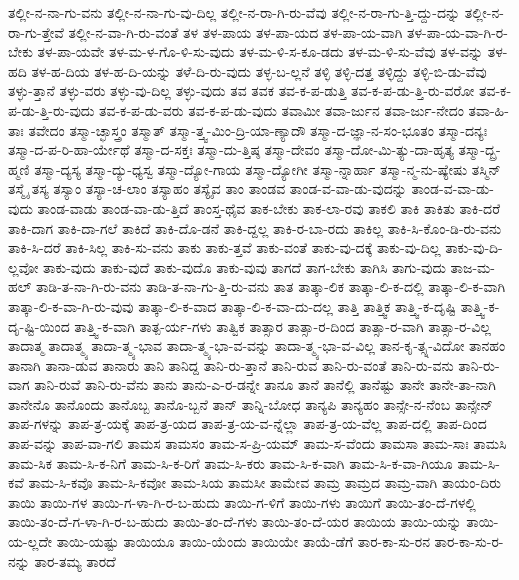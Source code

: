 {ತಲ್ಲೀ-ನ-ನಾ-ಗು-ವನು
ತಲ್ಲೀ-ನ-ನಾ-ಗು-ವು-ದಿಲ್ಲ
ತಲ್ಲೀ-ನ-ರಾ-ಗಿ-ರು-ವೆವು
ತಲ್ಲೀ-ನ-ರಾ-ಗು-ತ್ತಿ-ದ್ದು-ದನ್ನು
ತಲ್ಲೀ-ನ-ರಾ-ಗು-ತ್ತೇವೆ
ತಲ್ಲೀ-ನ-ವಾ-ಗಿ-ರು-ವಂತೆ
ತಳ
ತಳ-ಪಾಯ
ತಳ-ಪಾ-ಯದ
ತಳ-ಪಾ-ಯ-ವಾಗಿ
ತಳ-ಪಾ-ಯ-ವಾ-ಗಿ-ರ-ಬೇಕು
ತಳ-ಪಾ-ಯವೇ
ತಳ-ಮ-ಳ-ಗೊ-ಳಿ-ಸು-ವುದು
ತಳ-ಮ-ಳಿ-ಸ-ಕೂ-ಡದು
ತಳ-ಮ-ಳಿ-ಸು-ವೆವು
ತಳ-ವನ್ನು
ತಳ-ಹದಿ
ತಳ-ಹ-ದಿಯ
ತಳ-ಹ-ದಿ-ಯನ್ನು
ತಳೆ-ದಿ-ರು-ವುದು
ತಳ್ಳ-ಬ-ಲ್ಲನೆ
ತಳ್ಳಿ
ತಳ್ಳಿ-ದತ್ತ
ತಳ್ಳಿದ್ದು
ತಳ್ಳಿ-ಬಿ-ಡು-ವೆವು
ತಳ್ಳು-ತ್ತಾನೆ
ತಳ್ಳು-ವರು
ತಳ್ಳು-ವು-ದಿಲ್ಲ
ತಳ್ಳು-ವುದು
ತವ
ತವಕ
ತವ-ಕ-ಪ-ಡುತ್ತಿ
ತವ-ಕ-ಪ-ಡು-ತ್ತಿ-ರು-ವರೋ
ತವ-ಕ-ಪ-ಡು-ತ್ತಿ-ರು-ವುದು
ತವ-ಕ-ಪ-ಡು-ವರು
ತವ-ಕ-ಪ-ಡು-ವುದು
ತವಾಮೀ
ತವಾ-ರ್ಜುನ
ತವಾ-ರ್ಜು-ನೇದಂ
ತವಾ-ಹಿ-ತಾಃ
ತವೇದಂ
ತಸ್ಮಾ-ಚ್ಛಾಸ್ತ್ರಂ
ತಸ್ಮಾತ್
ತಸ್ಮಾ-ತ್ತ್ವ-ಮಿಂ-ದ್ರಿ-ಯಾ-ಣ್ಯಾದೌ
ತಸ್ಮಾ-ದ-ಜ್ಞಾ-ನ-ಸಂ-ಭೂತಂ
ತಸ್ಮಾ-ದನ್ಯಃ
ತಸ್ಮಾ-ದ-ಪ-ರಿ-ಹಾ-ರ್ಯೇಥೆ
ತಸ್ಮಾ-ದ-ಸಕ್ತಃ
ತಸ್ಮಾ-ದು-ತ್ತಿಷ್ಠ
ತಸ್ಮಾ-ದೇವಂ
ತಸ್ಮಾ-ದೋ-ಮಿ-ತ್ಯು-ದಾ-ಹೃತ್ಯ
ತಸ್ಮಾ-ದ್ಬ್ರ-ಹ್ಮಣಿ
ತಸ್ಮಾ-ದ್ಯಸ್ಯ
ತಸ್ಮಾ-ದ್ಯು-ಧ್ಯಸ್ವ
ತಸ್ಮಾ-ದ್ಯೋ-ಗಾಯ
ತಸ್ಮಾ-ದ್ಯೋಗೀ
ತಸ್ಮಾ-ನ್ನಾರ್ಹಾ
ತಸ್ಮಾ-ನ್ಮ-ನು-ಷ್ಯೇಷು
ತಸ್ಮಿನ್
ತಸ್ಮೈ
ತಸ್ಯ
ತಸ್ಯಾಂ
ತಸ್ಯಾ-ಚ-ಲಾಂ
ತಸ್ಯಾಹಂ
ತಸ್ಯೈವ
ತಾಂ
ತಾಂಡವ
ತಾಂಡ-ವ-ವಾ-ಡು-ವುದನ್ನು
ತಾಂಡ-ವ-ವಾ-ಡು-ವುದು
ತಾಂಡ-ವಾಡು
ತಾಂಡ-ವಾ-ಡು-ತ್ತಿದೆ
ತಾಂಸ್ತ-ಥೈವ
ತಾಕ-ಬೇಕು
ತಾಕ-ಲಾ-ರವು
ತಾಕಲಿ
ತಾಕಿ
ತಾಕಿತು
ತಾಕಿ-ದರೆ
ತಾಕಿ-ದಾಗ
ತಾಕಿ-ದಾ-ಗಲೆ
ತಾಕಿದೆ
ತಾಕಿ-ದೊ-ಡನೆ
ತಾಕಿ-ದ್ದಲ್ಲ
ತಾಕಿ-ರ-ಬಾ-ರದು
ತಾಕಿಲ್ಲ
ತಾಕಿ-ಸಿ-ಕೊಂ-ಡಿ-ರು-ವನು
ತಾಕಿ-ಸಿ-ದರೆ
ತಾಕಿ-ಸಿಲ್ಲ
ತಾಕಿ-ಸು-ವನು
ತಾಕು
ತಾಕು-ತ್ತವೆ
ತಾಕು-ವಂತೆ
ತಾಕು-ವು-ದಕ್ಕೆ
ತಾಕು-ವು-ದಿಲ್ಲ
ತಾಕು-ವು-ದಿ-ಲ್ಲವೋ
ತಾಕು-ವುದು
ತಾಕು-ವುದೆ
ತಾಕು-ವುದೊ
ತಾಕು-ವುವು
ತಾಗದೆ
ತಾಗ-ಬೇಕು
ತಾಗಿಸಿ
ತಾಗು-ವುದು
ತಾಜ-ಮ-ಹಲ್
ತಾಡಿ-ತ-ನಾ-ಗಿ-ರು-ವನು
ತಾಡಿ-ತ-ನಾ-ಗು-ತ್ತಿ-ರು-ವನು
ತಾತ
ತಾತ್ಕಾ-ಲಿಕ
ತಾತ್ಕಾ-ಲಿ-ಕ-ದಲ್ಲಿ
ತಾತ್ಕಾ-ಲಿ-ಕ-ವಾಗಿ
ತಾತ್ಕಾ-ಲಿ-ಕ-ವಾ-ಗಿ-ರು-ವುವು
ತಾತ್ಕಾ-ಲಿ-ಕ-ವಾದ
ತಾತ್ಕಾ-ಲಿ-ಕ-ವಾ-ದು-ದಲ್ಲ
ತಾತ್ತಿ
ತಾತ್ತ್ವಿಕ
ತಾತ್ತ್ವಿ-ಕ-ದೃಷ್ಟಿ
ತಾತ್ತ್ವಿ-ಕ-ದೃ-ಷ್ಟಿ-ಯಿಂದ
ತಾತ್ತ್ವಿ-ಕ-ವಾಗಿ
ತಾತ್ಪ-ರ್ಯ-ಗಳು
ತಾತ್ವಿಕ
ತಾತ್ಸಾರ
ತಾತ್ಸಾ-ರ-ದಿಂದ
ತಾತ್ಸಾ-ರ-ವಾಗಿ
ತಾತ್ಸಾ-ರ-ವಿಲ್ಲ
ತಾದಾತ್ಮ
ತಾದಾತ್ಮ್ಯ
ತಾದಾ-ತ್ಮ್ಯ-ಭಾವ
ತಾದಾ-ತ್ಮ್ಯ-ಭಾ-ವ-ವನ್ನು
ತಾದಾ-ತ್ಮ್ಯ-ಭಾ-ವ-ವಿಲ್ಲ
ತಾನ-ಕೃ-ತ್ಸ್ನ-ವಿದೋ
ತಾನಹಂ
ತಾನಾಗಿ
ತಾನಾ-ಡುವ
ತಾನಾರು
ತಾನಿ
ತಾನಿದ್ದ
ತಾನಿ-ರು-ತ್ತಾನೆ
ತಾನಿ-ರುವ
ತಾನಿ-ರು-ವಂತೆ
ತಾನಿ-ರು-ವನು
ತಾನಿ-ರು-ವಾಗ
ತಾನಿ-ರುವೆ
ತಾನಿ-ರು-ವೆನು
ತಾನು
ತಾನು-ಎ-ರ-ಡನ್ನೇ
ತಾನೂ
ತಾನೆ
ತಾನೆಲ್ಲಿ
ತಾನೆಷ್ಟು
ತಾನೇ
ತಾನೇ-ತಾ-ನಾಗಿ
ತಾನೇನೊ
ತಾನೊಂದು
ತಾನೊಬ್ಬ
ತಾನೊ-ಬ್ಬನೆ
ತಾನ್
ತಾನ್ನಿ-ಬೋಧ
ತಾನ್ಯಪಿ
ತಾನ್ಯಹಂ
ತಾನ್ಸೇ-ನ-ನೆಂಬ
ತಾನ್ಸೇನ್
ತಾಪ-ಗಳನ್ನು
ತಾಪ-ತ್ರ-ಯಕ್ಕೆ
ತಾಪ-ತ್ರ-ಯದ
ತಾಪ-ತ್ರ-ಯ-ವ-ನ್ನೆಲ್ಲಾ
ತಾಪ-ತ್ರ-ಯ-ವೆಲ್ಲ
ತಾಪ-ದಲ್ಲಿ
ತಾಪ-ದಿಂದ
ತಾಪ-ವನ್ನು
ತಾಪ-ವಾ-ಗಲಿ
ತಾಮಸ
ತಾಮಸಂ
ತಾಮ-ಸ-ಪ್ರಿ-ಯಮ್
ತಾಮ-ಸ-ವೆಂದು
ತಾಮಸಾ
ತಾಮ-ಸಾಃ
ತಾಮಸಿ
ತಾಮ-ಸಿಕ
ತಾಮ-ಸಿ-ಕ-ನಿಗೆ
ತಾಮ-ಸಿ-ಕ-ರಿಗೆ
ತಾಮ-ಸಿ-ಕರು
ತಾಮ-ಸಿ-ಕ-ವಾಗಿ
ತಾಮ-ಸಿ-ಕ-ವಾ-ಗಿಯೂ
ತಾಮ-ಸಿ-ಕವೆ
ತಾಮ-ಸಿ-ಕವೊ
ತಾಮ-ಸಿ-ಕವೋ
ತಾಮ-ಸಿಯ
ತಾಮಸೀ
ತಾಮೇವ
ತಾಮ್ರ
ತಾಮ್ರದ
ತಾಮ್ರ-ವಾಗಿ
ತಾಯಂ-ದಿರು
ತಾಯಿ
ತಾಯಿ-ಗಳ
ತಾಯಿ-ಗ-ಳಾ-ಗಿ-ರ-ಬ-ಹುದು
ತಾಯಿ-ಗ-ಳಿಗೆ
ತಾಯಿ-ಗಳು
ತಾಯಿಗೆ
ತಾಯಿ-ತಂ-ದೆ-ಗಳಲ್ಲಿ
ತಾಯಿ-ತಂ-ದೆ-ಗ-ಳಾ-ಗಿ-ರ-ಬ-ಹುದು
ತಾಯಿ-ತಂ-ದೆ-ಗಳು
ತಾಯಿ-ತಂ-ದೆ-ಯರ
ತಾಯಿಯ
ತಾಯಿ-ಯನ್ನು
ತಾಯಿ-ಯ-ಲ್ಲದೇ
ತಾಯಿ-ಯಷ್ಟು
ತಾಯಿಯೂ
ತಾಯಿ-ಯೆಂದು
ತಾಯಿಯೇ
ತಾಯೆ-ಡೆಗೆ
ತಾರ-ಕಾ-ಸು-ರನ
ತಾರ-ಕಾ-ಸು-ರ-ನನ್ನು
ತಾರ-ತಮ್ಯ
ತಾರದೆ
}
